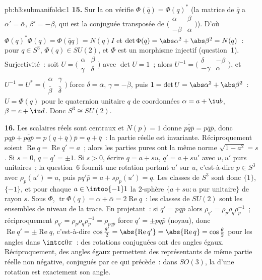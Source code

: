 \begin{solution}{pb:b3:submanifolds:1}
\textbf{15.} Sur la  on vérifie $\Phi(\bar q) =
\Phi(q)^*$ (la matrice de $\bar q$ a $\alpha' =
\bar\alpha$, $\beta' = -\beta$, qui est la conjuguée
transposée de $\bigl(\begin{smallmatrix}\alpha & \beta\\
-\bar\beta & \bar\alpha\end{smallmatrix}\bigr)$). D'où
$\Phi(q)^*\Phi(q) = \Phi(\bar qq) = N(q)I$ et $\det\Phi(q)
= \abs\alpha^2 + \abs\beta^2 = N(q)$~: pour $q \in S^3$,
$\Phi(q) \in SU(2)$, et $\Phi$ est un morphisme injectif
(question~1). Surjectivité~: soit $U =
\bigl(\begin{smallmatrix}\alpha & \beta\\ \gamma &
\delta\end{smallmatrix}\bigr)$ avec $\det U = 1$~; alors
$U^{-1} = \bigl(\begin{smallmatrix}\delta & -\beta\\
-\gamma & \alpha\end{smallmatrix}\bigr)$, et $U^{-1} = U^*
= \bigl(\begin{smallmatrix}\bar\alpha & \bar\gamma\\
\bar\beta & \bar\delta\end{smallmatrix}\bigr)$ force
$\delta = \bar\alpha$, $\gamma = -\bar\beta$, puis $1 =
\det U = \abs\alpha^2 + \abs\beta^2$~: $U = \Phi(q)$ pour
le quaternion unitaire $q$ de coordonnées $\alpha = a +
\iu b$, $\beta = c + \iu d$. Donc $S^3 \cong SU(2)$.

\textbf{16.} Les scalaires réels sont centraux et $N(p) =
1$ donne $\overline{pq\bar p} = p\bar q\bar p$, donc
$pq\bar p + \overline{pq\bar p} = p(q + \bar q)\bar p = q
+ \bar q$~: la partie réelle est invariante.
Réciproquement soient $\operatorname{Re}q =
\operatorname{Re}q' = a$~; alors les parties pures ont la
même norme $\sqrt{1 - a^2} = s$. Si $s = 0$, $q = q' =
\pm1$. Si $s > 0$, écrire $q = a + su$, $q' = a + su'$ avec
$u, u'$ purs unitaires~; la question~6 fournit une
rotation portant $u'$ sur $u$, c'est-à-dire $p \in S^3$
avec $\rho_p(u') = u$, puis $pq'\bar p = a +
s\rho_p(u') = q$. Les classes de $S^3$ sont donc $\{1\}$,
$\{-1\}$, et pour chaque $a \in \intoo{-1}1$ la $2$-sphère
$\{a + su : u \text{ pur unitaire}\}$ de rayon $s$. Sous
$\Phi$, $\operatorname{tr}\Phi(q) = \alpha + \bar\alpha =
2\operatorname{Re}q$~: les classes de $SU(2)$ sont les
ensembles de niveau de la trace. En projetant~: si $q' =
pq\bar p$ alors $\rho_{q'} = \rho_p\rho_q\rho_p^{-1}$~;
réciproquement $\rho_{q'} = \rho_p\rho_q\rho_p^{-1} =
\rho_{pq\bar p}$ force $q' = \pm pq\bar p$ (noyau), donc
$\operatorname{Re}q' = \pm\operatorname{Re}q$,
c'est-à-dire $\cos\frac{\theta'}2 =
\abs{\operatorname{Re}q'} = \abs{\operatorname{Re}q} =
\cos\frac\theta2$ pour les angles dans $\intcc0\pi$~: des
rotations conjuguées ont des angles égaux.
Réciproquement, des angles égaux permettent des
représentants de même partie réelle non négative, conjugués
par ce qui précède~: dans $SO(3)$, la 
d'une rotation est exactement son angle.


\end{solution}
